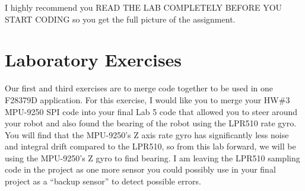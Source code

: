 \documentclass[11pt]{article}
\begin{document}
I highly recommend you READ THE LAB COMPLETELY BEFORE YOU START CODING so you get the full picture of the assignment.

\section*{Laboratory Exercises}


Our first and third exercises are to merge code together to be used in one F28379D application. For this exercise, I would like you to merge your HW\#3 MPU-9250 SPI code into your final Lab 5 code that allowed you to steer around your robot and also found the bearing of the robot using the LPR510 rate gyro. You will find that the MPU-9250’s Z axis rate gyro has significantly less noise and integral drift compared to the LPR510, so from this lab forward, we will be using the MPU-9250’s Z gyro to find bearing. I am leaving the LPR510 sampling code in the project as one more sensor you could possibly use in your final project as a “backup sensor” to detect possible errors.
\end{document}
